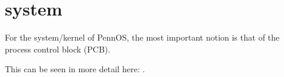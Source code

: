 \chapter{system}
\hypertarget{md_doc_2kernel_2system}{}\label{md_doc_2kernel_2system}
For the system/kernel of Penn\+OS, the most important notion is that of the process control block (PCB).

This can be seen in more detail here\+: . 